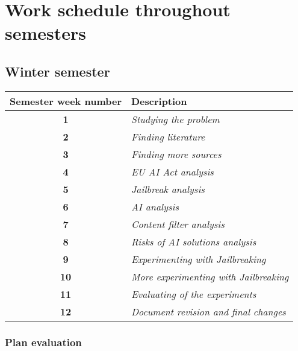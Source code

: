 \setcounter{figure}{0}
\setcounter{listing}{0}

\chapter{Work schedule throughout semesters \label{cha:work_schedule} }

\section*{Winter semester}

\begin{table}[htpb]
    \centering
    \begin{tabular}{|c|l|}
    \hline
    \cellcolor[gray]{0.8}\textbf{Semester week number} & \cellcolor[gray]{0.8}\textbf{Description} \\ \hline

    \textbf{1} & \textit{Studying the problem} \\ \hline
    \textbf{2} & \textit{Finding literature} \\ \hline
    \textbf{3} & \textit{Finding more sources} \\ \hline
    \textbf{4} & \textit{EU AI Act analysis} \\ \hline
    \textbf{5} & \textit{Jailbreak analysis} \\ \hline
    \textbf{6} & \textit{AI analysis} \\ \hline
    \textbf{7} & \textit{Content filter analysis} \\ \hline
    \textbf{8} & \textit{Risks of AI solutions analysis} \\ \hline
    \textbf{9} & \textit{Experimenting with Jailbreaking} \\ \hline
    \textbf{10} & \textit{More experimenting with Jailbreaking} \\ \hline
    \textbf{11} & \textit{Evaluating of the experiments} \\ \hline
    \textbf{12} & \textit{Document revision and final changes} \\ \hline
    \end{tabular}
\end{table}

\subsection*{Plan evaluation}

